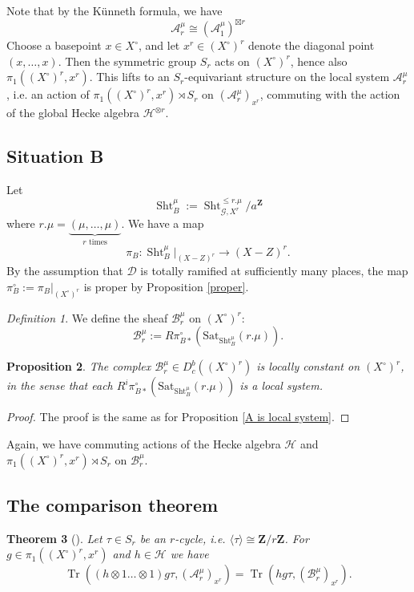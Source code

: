 \documentclass[reqno]{amsart}
\numberwithin{equation}{section}
\newcommand{\Z}{\mathbf{Z}}
\newcommand{\Cal}[1]{\mathcal{#1}}
\newcommand{\co}{\colon}
\newcommand{\mrm}[1]{\mathrm{#1}}
\newcommand{\cX}{X^{\circ}}
\DeclareMathOperator{\Tr}{Tr}
\DeclareMathOperator{\Sht}{Sht}
\newtheorem{thm}{Theorem}[section]
\newtheorem{prop}[thm]{Proposition}
\theoremstyle{remark}
\newtheorem{defn}[thm]{Definition}
\numberwithin{equation}{section}
\begin{document}
Note that by the K\"{u}nneth formula, we have 
\[
\Cal{A}_r^{\mu} \cong (\Cal{A}_1^{\mu})^{\boxtimes r}
\]
Choose a basepoint $x \in  \cX$, and let $x^r \in (\cX)^r$ denote the diagonal point $(x,\ldots, x)$. Then the symmetric group $S_r$ acts on $(\cX)^r$, hence also $\pi_1((\cX)^r,x^r)$. This lifts to an $S_r$-equivariant structure on the local system $\Cal{A}_r^{\mu}$, i.e. an action of $\pi_1((\cX)^r, x^r) \rtimes S_r$ on $(\Cal{A}_r^{\mu})_{x^r}$, commuting with the action of the global Hecke algebra $\Cal{H}^{\otimes  r}$. 

\subsection{Situation B}
Let 
\[
\Sht_B^{\mu} := \Sht_{\Cal{G}, X^r}^{\leq r.\mu}/a^{\Z}
\]
where $r.\mu = \underbrace{(\mu, \ldots, \mu)}_{r \text{ times}}$. We have a map
\[
\pi_B \co \Sht_B^{\mu}|_{(X-Z)^r}  \rightarrow (X-Z)^r.
\]
By the assumption that $\Cal{D}$ is totally ramified at sufficiently many places, the map $\pi_B^{\circ} := \pi_B|_{(\cX)^r}$ is proper by Proposition \ref{proper}.

\begin{defn} We define the sheaf $\Cal{B}^{\mu}_r$ on $(\cX)^r$: 
\[
\Cal{B}^{\mu}_r := R\pi_{B*}^{\circ} ( \mrm{Sat}_{\Sht_B^{\mu}}(r.\mu)).
\]
\end{defn}

\begin{prop}\label{B is local system}
The complex $\Cal{B}^{\mu}_r \in D_c^b((\cX)^r)$ is locally constant on $(\cX)^r$, in the sense that each $R^i\pi_{B*}^{\circ}  ( \mrm{Sat}_{\Sht_B^{\mu}}(r.\mu))$ is a local system. 
\end{prop}

\begin{proof}
The proof is the same as for Proposition \ref{A is local system}.
\end{proof}



Again, we have commuting actions of the Hecke algebra $\Cal{H}$ and $\pi_1((\cX)^r, x^r) \rtimes S_r $ on $\Cal{B}^{\mu}_r$.

\subsection{The comparison theorem}\label{subsec: comparison}

\begin{thm}[\cite{Ngo06}]\label{ngo main}
Let $\tau \in S_r$ be an $r$-cycle, i.e. $\langle \tau \rangle \cong \Z/r\Z$. For $g \in \pi_1((\cX)^r, x^r)$ and $h \in \Cal{H}$ we have 
\[
\Tr(( h\otimes 1 \ldots \otimes 1 ) g \tau , (\Cal{A}^{\mu}_r)_{x^r}) = \Tr(h g \tau, (\Cal{B}^{\mu}_r)_{x^r}).
\]
\end{thm}
\end{document}
